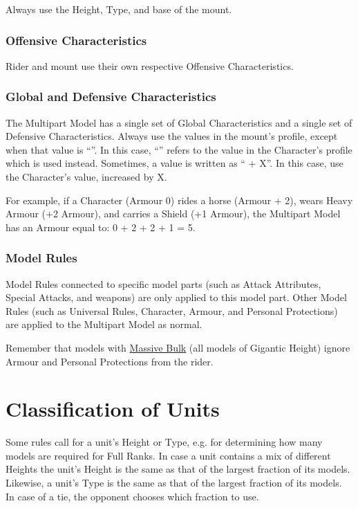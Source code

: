 Always use the Height, Type, and base of the mount.

\subsubsection{Offensive Characteristics}

Rider and mount use their own respective Offensive Characteristics.

\subsubsection{Global and Defensive Characteristics}
\label{defensive_and_global_characteristics}

The Multipart Model has a single set of Global Characteristics and a single set of Defensive Characteristics. Always use the values in the mount's profile, except when that value is \enquote{\ascharacter}. In this case, \enquote{\ascharacter} refers to the value in the Character's profile which is used instead. Sometimes, a value is written as \enquote{\ascharacter{} + X}. In this case, use the Character's value, increased by X.

For example, if a Character (Armour 0) rides a horse (Armour \ascharacter{} + 2), wears Heavy Armour (+2 Armour), and carries a Shield (+1 Armour), the Multipart Model has an Armour equal to: 0 + 2 + 2 + 1 = 5.

\subsubsection{Model Rules}

Model Rules connected to specific model parts (such as Attack Attributes, Special Attacks, and weapons) are only applied to this model part. Other Model Rules (such as Universal Rules, Character, Armour, and Personal Protections) are applied to the Multipart Model as normal.

Remember that models with \hyperref[massive_bulk]{Massive Bulk} (all models of Gigantic Height) ignore Armour and Personal Protections from the rider.

\section{Classification of Units}

Some rules call for a unit's Height or Type, e.g. for determining how many models are required for Full Ranks. In case a unit contains a mix of different Heights the unit's Height is the same as that of the largest fraction of its models. Likewise, a unit's Type is the same as that of the largest fraction of its models. In case of a tie, the opponent chooses which fraction to use.
